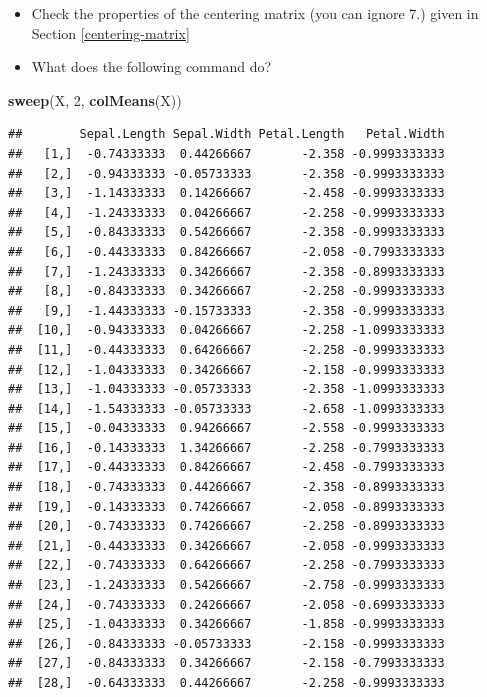 \documentclass[]{book}
\newenvironment{Shaded}{\begin{snugshade}}{\end{snugshade}}
\newcommand{\DecValTok}[1]{\textcolor[rgb]{0.00,0.00,0.81}{#1}}
\newcommand{\KeywordTok}[1]{\textcolor[rgb]{0.13,0.29,0.53}{\textbf{#1}}}
\newcommand{\NormalTok}[1]{#1}
\theoremstyle{definition}
\theoremstyle{definition}
\theoremstyle{definition}
\theoremstyle{remark}
\begin{document}
\begin{itemize}
\item
  Check the properties of the centering matrix (you can ignore 7.) given in Section \ref{centering-matrix}
\item
  What does the following command do?
\end{itemize}

\begin{Shaded}
\begin{Highlighting}[]
\KeywordTok{sweep}\NormalTok{(X, }\DecValTok{2}\NormalTok{, }\KeywordTok{colMeans}\NormalTok{(X))}
\end{Highlighting}
\end{Shaded}

\begin{verbatim}
##        Sepal.Length Sepal.Width Petal.Length   Petal.Width
##   [1,]  -0.74333333  0.44266667       -2.358 -0.9993333333
##   [2,]  -0.94333333 -0.05733333       -2.358 -0.9993333333
##   [3,]  -1.14333333  0.14266667       -2.458 -0.9993333333
##   [4,]  -1.24333333  0.04266667       -2.258 -0.9993333333
##   [5,]  -0.84333333  0.54266667       -2.358 -0.9993333333
##   [6,]  -0.44333333  0.84266667       -2.058 -0.7993333333
##   [7,]  -1.24333333  0.34266667       -2.358 -0.8993333333
##   [8,]  -0.84333333  0.34266667       -2.258 -0.9993333333
##   [9,]  -1.44333333 -0.15733333       -2.358 -0.9993333333
##  [10,]  -0.94333333  0.04266667       -2.258 -1.0993333333
##  [11,]  -0.44333333  0.64266667       -2.258 -0.9993333333
##  [12,]  -1.04333333  0.34266667       -2.158 -0.9993333333
##  [13,]  -1.04333333 -0.05733333       -2.358 -1.0993333333
##  [14,]  -1.54333333 -0.05733333       -2.658 -1.0993333333
##  [15,]  -0.04333333  0.94266667       -2.558 -0.9993333333
##  [16,]  -0.14333333  1.34266667       -2.258 -0.7993333333
##  [17,]  -0.44333333  0.84266667       -2.458 -0.7993333333
##  [18,]  -0.74333333  0.44266667       -2.358 -0.8993333333
##  [19,]  -0.14333333  0.74266667       -2.058 -0.8993333333
##  [20,]  -0.74333333  0.74266667       -2.258 -0.8993333333
##  [21,]  -0.44333333  0.34266667       -2.058 -0.9993333333
##  [22,]  -0.74333333  0.64266667       -2.258 -0.7993333333
##  [23,]  -1.24333333  0.54266667       -2.758 -0.9993333333
##  [24,]  -0.74333333  0.24266667       -2.058 -0.6993333333
##  [25,]  -1.04333333  0.34266667       -1.858 -0.9993333333
##  [26,]  -0.84333333 -0.05733333       -2.158 -0.9993333333
##  [27,]  -0.84333333  0.34266667       -2.158 -0.7993333333
##  [28,]  -0.64333333  0.44266667       -2.258 -0.9993333333

\end{verbatim}
\end{document}
